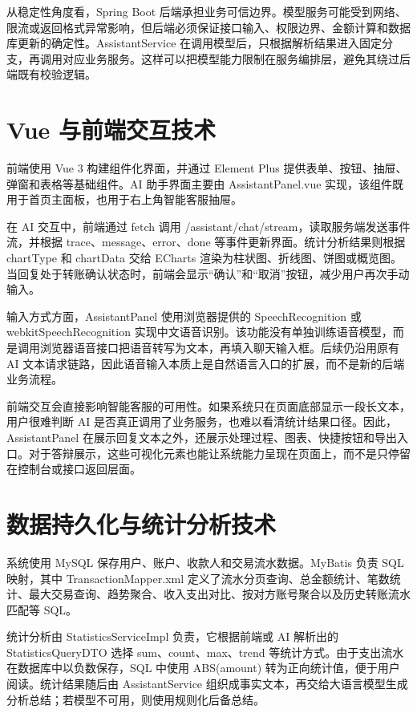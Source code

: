 \documentclass[bachelor, print]{xduthesis}
\begin{document}
从稳定性角度看，Spring Boot 后端承担业务可信边界。模型服务可能受到网络、限流或返回格式异常影响，但后端必须保证接口输入、权限边界、金额计算和数据库更新的确定性。AssistantService 在调用模型后，只根据解析结果进入固定分支，再调用对应业务服务。这样可以把模型能力限制在服务编排层，避免其绕过后端既有校验逻辑。

\section{Vue 与前端交互技术}

前端使用 Vue 3 构建组件化界面\cite{vue}，并通过 Element Plus 提供表单、按钮、抽屉、弹窗和表格等基础组件。AI 助手界面主要由 AssistantPanel.vue 实现，该组件既用于首页主面板，也用于右上角智能客服抽屉。

在 AI 交互中，前端通过 fetch 调用 /assistant/chat/stream，读取服务端发送事件流，并根据 trace、message、error、done 等事件更新界面。统计分析结果则根据 chartType 和 chartData 交给 ECharts 渲染为柱状图、折线图、饼图或概览图\cite{echarts}。当回复处于转账确认状态时，前端会显示“确认”和“取消”按钮，减少用户再次手动输入。

输入方式方面，AssistantPanel 使用浏览器提供的 SpeechRecognition 或 webkitSpeechRecognition 实现中文语音识别。该功能没有单独训练语音模型，而是调用浏览器语音接口把语音转写为文本，再填入聊天输入框。后续仍沿用原有 AI 文本请求链路，因此语音输入本质上是自然语言入口的扩展，而不是新的后端业务流程。

前端交互会直接影响智能客服的可用性。如果系统只在页面底部显示一段长文本，用户很难判断 AI 是否真正调用了业务服务，也难以看清统计结果口径。因此，AssistantPanel 在展示回复文本之外，还展示处理过程、图表、快捷按钮和导出入口。对于答辩展示，这些可视化元素也能让系统能力呈现在页面上，而不是只停留在控制台或接口返回层面。

\section{数据持久化与统计分析技术}

系统使用 MySQL 保存用户、账户、收款人和交易流水数据。MyBatis 负责 SQL 映射\cite{mybatis}，其中 TransactionMapper.xml 定义了流水分页查询、总金额统计、笔数统计、最大交易查询、趋势聚合、收入支出对比、按对方账号聚合以及历史转账流水匹配等 SQL。

统计分析由 StatisticsServiceImpl 负责，它根据前端或 AI 解析出的 StatisticsQueryDTO 选择 sum、count、max、trend 等统计方式。由于支出流水在数据库中以负数保存，SQL 中使用 ABS(amount) 转为正向统计值，便于用户阅读。统计结果随后由 AssistantService 组织成事实文本，再交给大语言模型生成分析总结；若模型不可用，则使用规则化后备总结。
\end{document}
